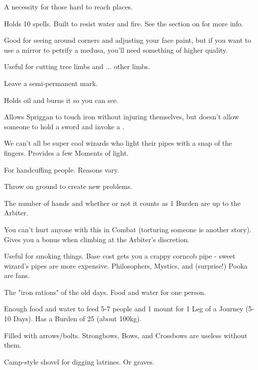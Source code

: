 \begin{multicols}{2}
   A necessity for those hard to reach places.
  
   Holds 10 spells. Built to resist water and fire. See the section on  for more info.


   Good for seeing around corners and adjusting your face paint, but if you want to use a mirror to petrify a medusa,  you'll need something of higher quality.

    Useful for cutting tree limbs and ... other limbs.

    Leave a semi-permanent mark.

   Holds oil and burns it so you can see.
  
   Allows Spriggan to touch iron without injuring themselves, but doesn't allow someone to hold a sword and invoke a .
  
   We can't all be super cool wizards who light their pipes with a snap of the fingers.  Provides a few Moments of light.
  
   For handcuffing people.  Reasons vary.

   Throw on ground to create new problems.

   The number of hands and whether or not it counts as 1 Burden are up to the Arbiter. 

   You can't hurt anyone with this in Combat (torturing someone is another story). Gives you a bonus when climbing at the Arbiter's discretion.
  
   Useful for smoking things. Base cost gets you a crappy corncob pipe - sweet wizard's pipes are more expensive.  Philosophers, Mystics, and (surprise!) Pooka are fans.
  
   The "iron rations" of the old days.  Food and water for one person.



   Enough food and water to feed 5-7 people and 1 mount for 1 Leg of a Journey (5-10 Days).  Has a Burden of 25 (about 100kg).
  
   Filled with arrows/bolts.  Strongbows, Bows, and Crossbows are useless without them.


   Camp-style shovel for digging latrines. Or graves.


\end{multicols}
